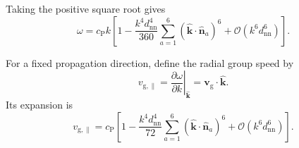 Taking the positive square root gives
\begin{equation}
    \omega
    =
    c_{\mathrm P}k
    \left[
        1
        -
        \frac{
            k^4d_{\mathrm{nn}}^4
        }{
            360
        }
        \sum_{a=1}^{6}
        \left(
            \widehat{\mathbf k}
            \cdot
            \widehat{\mathbf n}_a
        \right)^6
        +
        \mathcal O
        \left(
            k^6d_{\mathrm{nn}}^6
        \right)
    \right].
    \label{eq:photon_relaxation_exact_frequency_expansion}
\end{equation}

For a fixed propagation direction, define the radial group speed by
\begin{equation}
    v_{\mathrm{g},\parallel}
    =
    \left.
        \frac{
            \partial\omega
        }{
            \partial k
        }
    \right|_{\widehat{\mathbf k}}
    =
    \mathbf v_{\mathrm g}
    \cdot
    \widehat{\mathbf k}.
    \label{eq:photon_relaxation_radial_group_speed}
\end{equation}
Its expansion is
\begin{equation}
    v_{\mathrm{g},\parallel}
    =
    c_{\mathrm P}
    \left[
        1
        -
        \frac{
            k^4d_{\mathrm{nn}}^4
        }{
            72
        }
        \sum_{a=1}^{6}
        \left(
            \widehat{\mathbf k}
            \cdot
            \widehat{\mathbf n}_a
        \right)^6
        +
        \mathcal O
        \left(
            k^6d_{\mathrm{nn}}^6
        \right)
    \right].
    \label{eq:photon_relaxation_suppressed_group_velocity}
\end{equation}

